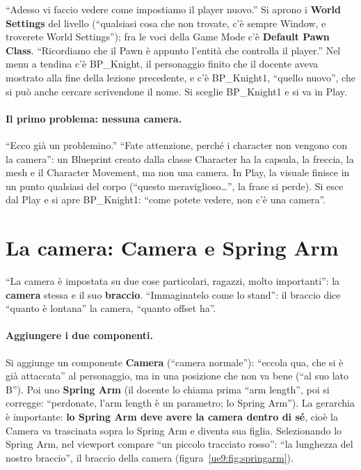 ``Adesso vi faccio vedere come impostiamo il player nuovo.'' Si aprono i \textbf{World
Settings} del livello (``qualsiasi cosa che non trovate, c'è sempre Window, e troverete
World Settings''); fra le voci della Game Mode c'è \textbf{Default Pawn Class}.
``Ricordiamo che il Pawn è appunto l'entità che controlla il player.'' Nel menu a
tendina c'è BP\_Knight, il personaggio finito che il docente aveva mostrato alla fine
della lezione precedente, e c'è BP\_Knight1, ``quello nuovo'', che si può anche cercare
scrivendone il nome. Si sceglie BP\_Knight1 e si va in Play.

\paragraph{Il primo problema: nessuna camera.} ``Ecco già un problemino.'' ``Fate
attenzione, perché i character non vengono con la camera'': un Blueprint creato dalla
classe Character ha la capsula, la freccia, la mesh e il Character Movement, ma non una
camera. In Play, la visuale finisce in un punto qualsiasi del corpo (``questo
meraviglioso\dots'', la frase si perde). Si esce dal Play e si apre BP\_Knight1: ``come
potete vedere, non c'è una camera''.

\section{La camera: Camera e Spring Arm}
\label{ue9:sec:camera}

``La camera è impostata su due cose particolari, ragazzi, molto importanti'': la
\textbf{camera} stessa e il suo \textbf{braccio}. ``Immaginatelo come lo stand'': il
braccio dice ``quanto è lontana'' la camera, ``quanto offset ha''.

\paragraph{Aggiungere i due componenti.} Si aggiunge un componente \textbf{Camera}
(``camera normale''): ``eccola qua, che si è già attaccata'' al personaggio, ma in una
posizione che non va bene (``al suo lato B''). Poi uno \textbf{Spring Arm} (il docente
lo chiama prima ``arm length'', poi si corregge: ``perdonate, l'arm length è un
parametro; lo Spring Arm''). La gerarchia è importante: \textbf{lo Spring Arm deve avere
la camera dentro di sé}, cioè la Camera va trascinata sopra lo Spring Arm e diventa sua
figlia. Selezionando lo Spring Arm, nel viewport compare ``un piccolo tracciato rosso'':
``la lunghezza del nostro braccio'', il braccio della camera
(figura~\ref{ue9:fig:springarm}).

